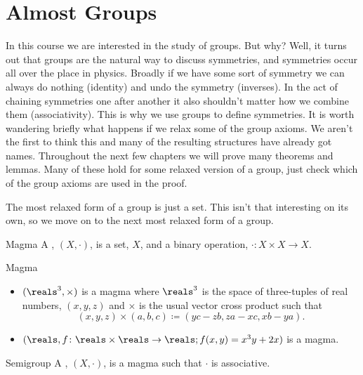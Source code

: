 
\section{Almost Groups}
In this course we are interested in the study of groups.
But why?
Well, it turns out that groups are the natural way to discuss symmetries, and symmetries occur all over the place in physics.
Broadly if we have some sort of symmetry we can always do nothing (identity) and undo the symmetry (inverses).
In the act of chaining symmetries one after another it also shouldn't matter how we combine them (associativity).
This is why we use groups to define symmetries.
It is worth wandering briefly what happens if we relax some of the group axioms.
We aren't the first to think this and many of the resulting structures have already got names.
Throughout the next few chapters we will prove many theorems and lemmas.
Many of these hold for some relaxed version of a group, just check which of the group axioms are used in the proof.

The most relaxed form of a group is just a set.
This isn't that interesting on its own, so we move on to the next most relaxed form of a group.
\begin{dfn}{Magma}{}
    A , \((X, \cdot)\), is a set, \(X\), and a binary operation, \(\cdot \colon X \times X \to X\).
\end{dfn}

\begin{exm}{Magma}{}
    \begin{itemize}
        \item \((\reals^3, \times)\) is a magma where \(\reals^3\) is the space of three-tuples of real numbers, \((x, y, z)\) and \(\times\) is the usual vector cross product such that
        \begin{equation}
            (x, y, z) \times (a, b, c) \coloneqq (yc - zb, za - xc, xb - ya).
        \end{equation}
    
        \item \((\reals, f\colon\reals\times\reals\to\reals; f(x, y) = x^3y + 2x)\) is a magma.
    \end{itemize}
\end{exm}

\begin{dfn}{Semigroup}{}
    A , \((X, \cdot)\), is a magma such that \(\cdot\) is associative.
\end{dfn}

